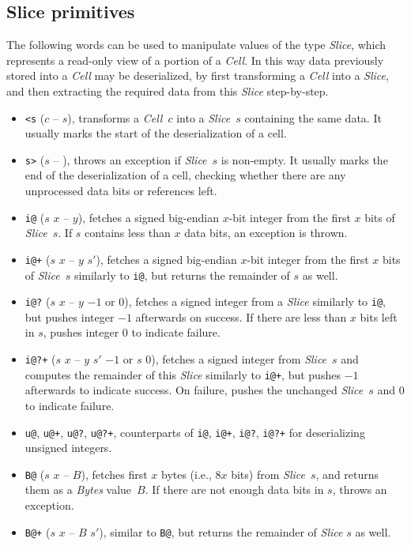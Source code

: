 \documentclass[12pt,oneside]{article}
\def\mysubsection#1{\subsection{#1}\fancyhead[C]{\small{\textsc{\textrm{\thesubsection.} #1}}}}
\begin{document}
\mysubsection{Slice primitives}\label{p:slice.ops}
The following words can be used to manipulate values of the type {\em Slice\/}, which represents a read-only view of a portion of a {\em Cell}. In this way data previously stored into a {\em Cell\/} may be deserialized, by first transforming a {\em Cell\/} into a {\em Slice}, and then extracting the required data from this {\em Slice\/} step-by-step.
\begin{itemize}
\item {\tt <s} ($c$ -- $s$), transforms a {\em Cell\/}~$c$ into a {\em Slice\/}~$s$ containing the same data. It usually marks the start of the deserialization of a cell.
\item {\tt s>} ($s$ -- ), throws an exception if {\em Slice\/}~$s$ is non-empty. It usually marks the end of the deserialization of a cell, checking whether there are any unprocessed data bits or references left.
\item {\tt i@} ($s$ $x$ -- $y$), fetches a signed big-endian $x$-bit integer from the first $x$ bits of {\em Slice}~$s$. If $s$ contains less than $x$ data bits, an exception is thrown.
\item {\tt i@+} ($s$ $x$ -- $y$ $s'$), fetches a signed big-endian $x$-bit integer from the first $x$ bits of {\em Slice}~$s$ similarly to {\tt i@}, but returns the remainder of $s$ as well.
\item {\tt i@?} ($s$ $x$ -- $y$ $-1$ or $0$), fetches a signed integer from a {\em Slice\/} similarly to {\tt i@}, but pushes integer $-1$ afterwards on success. If there are less than $x$ bits left in $s$, pushes integer $0$ to indicate failure.
\item {\tt i@?+} ($s$ $x$ -- $y$ $s'$ $-1$ or $s$ $0$), fetches a signed integer from {\em Slice\/}~$s$ and computes the remainder of this {\em Slice\/} similarly to {\tt i@+}, but pushes $-1$ afterwards to indicate success. On failure, pushes the unchanged {\em Slice\/}~$s$ and $0$ to indicate failure.
\item {\tt u@}, {\tt u@+}, {\tt u@?}, {\tt u@?+}, counterparts of {\tt i@}, {\tt i@+}, {\tt i@?}, {\tt i@?+} for deserializing unsigned integers.
\item {\tt B@} ($s$ $x$ -- $B$), fetches first $x$ bytes (i.e., $8x$ bits) from {\em Slice}~$s$, and returns them as a {\em Bytes\/} value~$B$. If there are not enough data bits in $s$, throws an exception.
\item {\tt B@+} ($s$ $x$ -- $B$ $s'$), similar to {\tt B@}, but returns the remainder of {\em Slice\/} $s$ as well.

\end{itemize}
\end{document}
